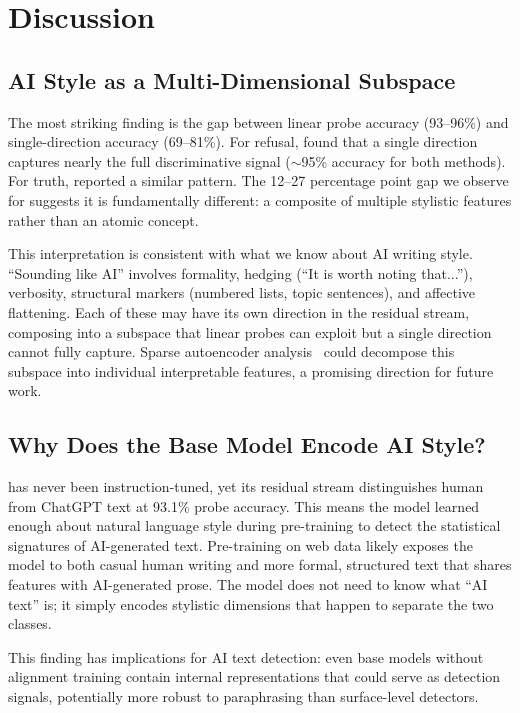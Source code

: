 \section{Discussion}
\label{sec:discussion}

\subsection{AI Style as a Multi-Dimensional Subspace}

The most striking finding is the gap between linear probe accuracy (93--96\%) and \diffmean single-direction accuracy (69--81\%).
For refusal, \citet{arditi2024refusal} found that a single direction captures nearly the full discriminative signal ($\sim$95\% accuracy for both methods).
For truth, \citet{marks2024geometry} reported a similar pattern.
The 12--27 percentage point gap we observe for \aistyle suggests it is fundamentally different: a composite of multiple stylistic features rather than an atomic concept.

This interpretation is consistent with what we know about AI writing style.
``Sounding like AI'' involves formality, hedging (``It is worth noting that...''), verbosity, structural markers (numbered lists, topic sentences), and affective flattening.
Each of these may have its own direction in the residual stream, composing into a subspace that linear probes can exploit but a single direction cannot fully capture.
Sparse autoencoder analysis~\citep{cunningham2023sparse} could decompose this subspace into individual interpretable features, a promising direction for future work.

\subsection{Why Does the Base Model Encode AI Style?}

\pythia has never been instruction-tuned, yet its residual stream distinguishes human from ChatGPT text at 93.1\% probe accuracy.
This means the model learned enough about natural language style during pre-training to detect the statistical signatures of AI-generated text.
Pre-training on web data likely exposes the model to both casual human writing and more formal, structured text that shares features with AI-generated prose.
The model does not need to know what ``AI text'' is; it simply encodes stylistic dimensions that happen to separate the two classes.

This finding has implications for AI text detection: even base models without alignment training contain internal representations that could serve as detection signals, potentially more robust to paraphrasing than surface-level detectors.

